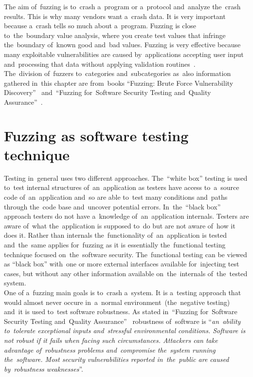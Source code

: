 The aim of~fuzzing is to~crash a~program or a~protocol and~analyze the~crash results.
This is why many vendors want a~crash data. It is very important because a~crash
tells so much about a~program. Fuzzing is close to~the~boundary value analysis, where
you create test values that infringe the~boundary of~known good and~bad values.
Fuzzing is very effective because many exploitable vulnerabilities are caused
by~applications accepting user input and~processing that data without applying
validation routines~\cite{Fuzzing}.\\

The~division of~fuzzers to~categories and~subcategories as~also information
gathered in~this chapter are from~books ``Fuzzing: Brute Force Vulnerability
Discovery''~\cite{Fuzzing} and~``Fuzzing for~Software Security Testing and~Quality
Assurance''~\cite{Fuzzing2}.


\section{Fuzzing as software testing technique}
Testing in~general uses two different approaches. The~``white box'' testing is used
to~test internal structures of~an~application as testers have access to~a~source code
of~an~application and~so are able to~test many conditions and~paths through the~code
base and~uncover potential errors. In~the~``black box'' approach testers do not have
a~knowledge of~an~application internals. Testers are aware of~what the~application is
supposed to~do but are not aware of~how it does it. Rather than internals
the~functionality of~an~application is tested and~the~same applies for~fuzzing
as it is essentially the~functional testing technique focused on~the~software
security. The~functional testing can be viewed as ``black box'' with~one or more
external interfaces available for~injecting test cases, but without any other
information available on~the~internals of~the~tested system.\\

One of a~fuzzing main goals is to~crash a~system. It is a~testing approach that
would almost never occure in~a~normal environment~(the~negative testing) and~it
is used to~test software robustness. As stated in~``Fuzzing for~Software Security
Testing and~Quality Assurance''~\cite[p.~18]{Fuzzing2} robustness of~software is
``\emph{an~ability to~tolerate exceptional inputs and~stressful environmental
conditions. Software is not robust if it fails when facing such circumstances.
Attackers can take advantage of~robustness problems and~compromise the~system
running the~software. Most security vulnerabilities reported in~the~public are
caused by~robustness weaknesses}''.\\

